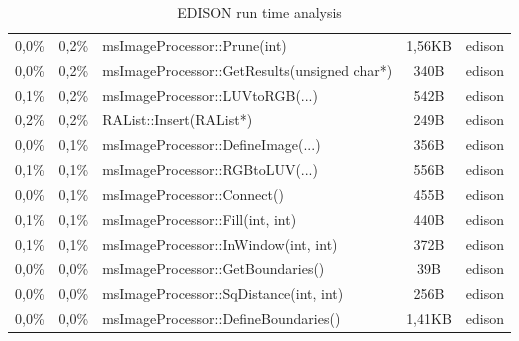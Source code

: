 \begin{table}[ht]
\begin{tabularx}{\textwidth}{cclcc}
	0,0\% & 	0,2\% & 	msImageProcessor::Prune(int) &					1,56KB & edison \\ 
	0,0\% & 	0,2\% & 	msImageProcessor::GetResults(unsigned char*) & 	340B & 	edison \\
	0,1\% & 	0,2\% & 	msImageProcessor::LUVtoRGB(...) &				542B & 	edison \\
	0,2\% & 	0,2\% & 	RAList::Insert(RAList*) &						249B & 	edison \\
	0,0\% & 	0,1\% & 	msImageProcessor::DefineImage(...) &				356B & 	edison \\
	0,1\% & 	0,1\% & 	msImageProcessor::RGBtoLUV(...) &				556B & 	edison \\
	0,0\% & 	0,1\% & 	msImageProcessor::Connect() &					455B & 	edison \\
	0,1\% & 	0,1\% & 	msImageProcessor::Fill(int, int) & 				440B & 	edison \\
	0,1\% & 	0,1\% & 	msImageProcessor::InWindow(int, int) & 			372B &	edison \\
	0,0\% & 	0,0\% &	msImageProcessor::GetBoundaries() &				39B & 	edison \\
	0,0\% & 	0,0\% & 	msImageProcessor::SqDistance(int, int) & 			256B & 	edison \\ 
	0,0\% & 	0,0\% & 	msImageProcessor::DefineBoundaries() &			1,41KB & edison \\ 
    \bottomrule
  \end{tabularx}
  \caption[EDISON run time profile]{\gls{EDISON} run time analysis}
  \label{tab:comp}
\end{table}




